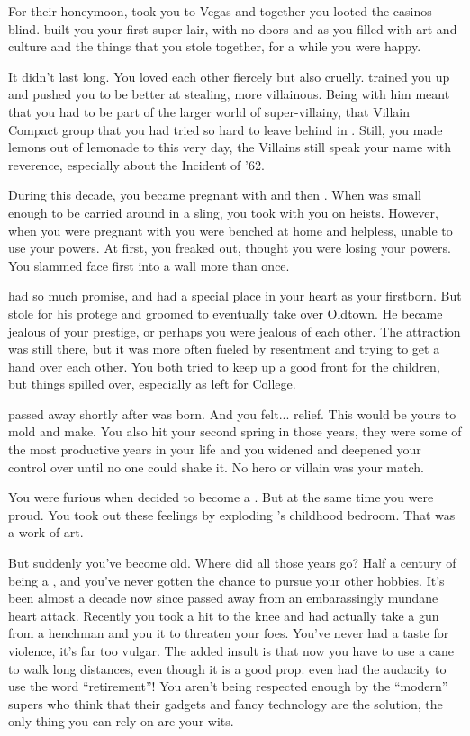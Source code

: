 \documentclass[char]{LRSguildcamp1}
\begin{document}
For their honeymoon, \cGS{\they} took you to Vegas and together you looted the casinos blind. \cGS{\They} built you your first super-lair, with no doors and as you filled with art and culture and the things that you stole together, for a while you were happy. 

It didn't last long. You loved each other fiercely but also cruelly. \cGS{} trained you up and pushed you to be better at stealing, more villainous. Being with him meant that you had to be part of the larger world of super-villainy, that Villain Compact group that you had tried so hard to leave behind in \pSuperSchool{}. Still, you made lemons out of lemonade to this very day, the Villains still speak your name with reverence, especially about the Incident of '62. 

During this decade, you became pregnant with \cOldest{} and then \cArchitect{}. When \cOldest{} was small enough to be carried around in a sling, you took \cOldest{\them} with you on heists. However, when you were pregnant with \cArchitect{} you were benched at home and helpless, unable to use your powers.  At first, you freaked out, thought you were losing your powers. You slammed face first into a wall more than once.

\cOldest{} had so much promise, and had a special place in your heart as your firstborn. But \cGS{} stole \cOldest{} for his protege and groomed \cOldest{\them} to eventually take over Oldtown. He became jealous of your prestige, or perhaps you were jealous of each other. The attraction was still there, but it was more often fueled by resentment and trying to get a hand over each other.  You both tried to keep up a good front for the children, but things spilled over, especially as \cOldest{} left for College. 

\cGS{} passed away shortly after \cYoungest{} was born. And you felt... relief. This \cYoungest{\offspring} would be yours to mold and make. You also hit your second spring in those years, they were some of the most productive years in your life and you widened and deepened your control over \pCityGrandma{} until no one could shake it. No hero or villain was your match. 

You were furious when \cYoungest{} decided to become a \cYoungest{\hero}. But at the same time you were proud. You took out these feelings by exploding \cYoungest{}’s childhood bedroom. That was a work of art. 

But suddenly you’ve become old. Where did all those years go? Half a century of being a \cGrandma{\villain}, and you’ve never gotten the chance to pursue your other hobbies. It’s been almost a decade now since \cGS{\they} passed away from an embarassingly mundane heart attack.  Recently you took a hit to the knee and had actually take a gun from a henchman and you it to threaten your foes. You’ve never had a taste for violence, it’s far too vulgar. The added insult is that now you have to use a cane to walk long distances, even though it is a good prop. \cOldest{} even had the audacity to use the word “retirement”! You aren’t being respected enough by the “modern” supers who think that their gadgets and fancy technology are the solution, the only thing you can rely on are your wits. 
\end{document}

